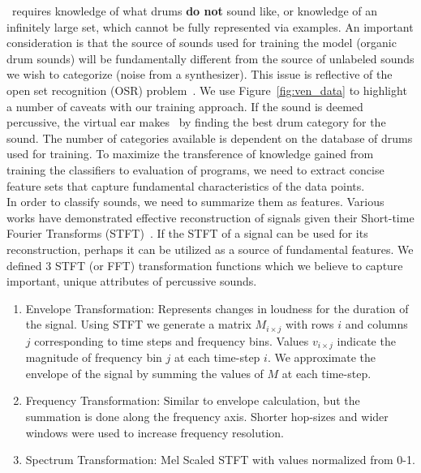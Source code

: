 \documentclass[runningheads,a4paper]{llncs}
\begin{document}
\decfirst~requires knowledge of what drums \textbf{do not} sound like, or knowledge of an infinitely large set, which cannot be fully represented via examples. An important consideration is that the source of sounds used for training the model (organic drum sounds) will be fundamentally different from the source of unlabeled sounds we wish to categorize (noise from a synthesizer). This issue is reflective of the open set recognition (OSR) problem~\cite{geng2020recent,mundt2019open}. We use Figure~\ref{fig:ven_data} to highlight a number of caveats with our training approach. If the sound is deemed percussive, the virtual ear makes \decsecond~by finding the best drum category for the sound. The number of categories available is dependent on the database of drums used for training. 
To maximize the transference of knowledge gained from training the classifiers to evaluation of programs, we need to extract concise feature sets that capture fundamental characteristics of the data points.\\

In order to classify sounds, we need to summarize them as features. Various works have demonstrated effective reconstruction of signals given their Short-time Fourier Transforms (STFT)~\cite{nawab1983signal,griffin1984signal}. If the STFT of a signal can be used for its reconstruction, perhaps it can be utilized as a source of fundamental features. We defined 3 STFT (or FFT) transformation functions which we believe to capture important, unique attributes of percussive sounds. 
\begin{enumerate}
\item Envelope Transformation: Represents changes in loudness for the duration of the signal. Using STFT we generate a matrix $M_{i \times j}$ with rows $i$ and columns $j$ corresponding to time steps and frequency bins. Values $v_{i \times j}$ indicate the magnitude of frequency bin $j$ at each time-step $i$. We approximate the envelope of the signal by summing the values of $M$ at each time-step. 
\item Frequency Transformation:  Similar to envelope calculation, but the summation is done along the frequency axis. Shorter hop-sizes and wider windows were used to increase frequency resolution. 
\item Spectrum Transformation: Mel Scaled STFT with values normalized from 0-1. 
\end{enumerate}
\end{document}
